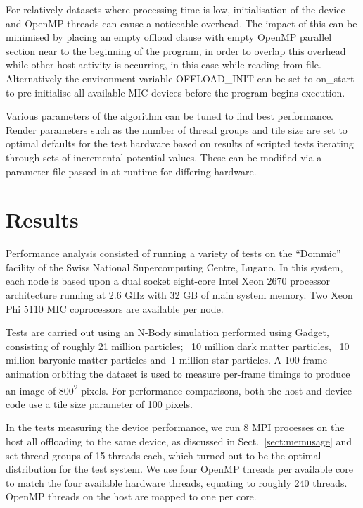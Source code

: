 \documentclass[runningheads,a4paper]{llncs}
\begin{document}
For relatively datasets where processing time is low, initialisation of the device and OpenMP threads can cause a noticeable overhead. 
The impact of this can be minimised by placing an empty offload clause with empty OpenMP parallel section near to the beginning of 
the program, in order to overlap this overhead while other host activity is occurring, in this case while reading from file. 
Alternatively the environment variable OFFLOAD\_INIT can be set to on\_start to pre-initialise all available MIC devices before the 
program begins execution. 

Various parameters of the algorithm can be tuned to find best performance. Render parameters such as the number of 
thread groups and tile size are set to optimal defaults for the test hardware based on results of scripted tests iterating 
through sets of incremental potential values. These can be modified via a parameter file passed in at runtime for differing 
hardware.

\section{Results}
\label{sect:results}

Performance analysis consisted of running a variety of tests on the “Dommic” facility of the Swiss National Supercomputing Centre, 
Lugano. In this system, each node is based upon a dual socket eight-core Intel Xeon 2670 processor architecture running at 2.6 GHz 
with 32 GB of main system memory. Two Xeon Phi 5110 MIC coprocessors are available per node. 

Tests are carried out using an N-Body simulation performed using Gadget, consisting of roughly 21 million 
particles; ~10 million dark matter particles, ~10 million baryonic matter particles and~1 million star particles. 
A 100 frame animation orbiting the dataset is used to measure per-frame timings to produce an image of 800\textsuperscript{2} pixels. 
For performance comparisons, both the host and device code use a tile size parameter of 100 pixels.

In the tests measuring the device performance, we run 8 MPI processes on the host all offloading to the same device, 
as discussed in Sect.~\ref{sect:memusage} and set thread groups of 15 threads each, which turned out to be the optimal distribution 
for the test system. We use four OpenMP threads per available core to match the four available hardware threads, equating to roughly 240 threads.
OpenMP threads on the host are mapped to one per core.
\end{document}
